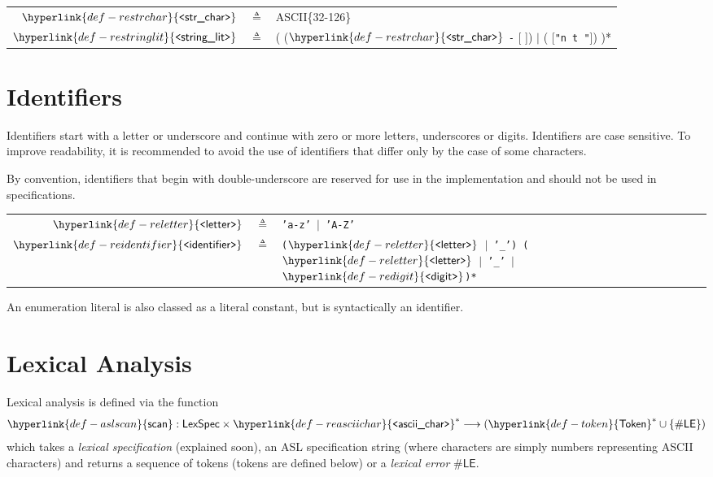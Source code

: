 \documentclass{book}
\newcommand\Char[1]{\fbox{#1}}
\newcommand\REasciichar[0]{\hyperlink{def-reasciichar}{\texttt{<}\textsf{ascii\_char}\texttt{>}}}
\newcommand\REdigit[0]{\hyperlink{def-redigit}{\texttt{<}\textsf{digit}\texttt{>}}}
\newcommand\REstrchar[0]{\hyperlink{def-restrchar}{\texttt{<}\textsf{str\_char}\texttt{>}}}
\newcommand\REstringlit[0]{\hyperlink{def-restringlit}{\texttt{<}\textsf{string\_lit}\texttt{>}}}
\newcommand\REletter[0]{\hyperlink{def-reletter}{\texttt{<}\textsf{letter}\texttt{>}}}
\newcommand\REidentifier[0]{\hyperlink{def-reidentifier}{\texttt{<}\textsf{identifier}\texttt{>}}}
\newcommand\aslscan[0]{\hyperlink{def-aslscan}{\textsf{scan}}}
\newcommand\Token[0]{\hyperlink{def-token}{\textsf{Token}}}
\newcommand\LexicalError[0]{\textsf{\#LE}}
\newcommand\LexSpec[0]{\textsf{LexSpec}}
\begin{document}
\hypertarget{def-restringlit}{}
\hypertarget{def-restrchar}{}
\begin{center}
\begin{tabular}{rcl}
$\REstrchar$ &$\triangleq$& ASCII\{32-126\}\\
$\REstringlit$ &$\triangleq$& \Char{\texttt{"}} ( ($\REstrchar$ \texttt{-} [ \Char{\texttt{"}} \Char{$\backslash$}]) $|$ (\Char{\textbackslash} [\texttt{"n t \Char{\texttt{"}} \Char{\textbackslash}"}])  )* \Char{\texttt{"}}
\end{tabular}
\end{center}

\section{Identifiers}
Identifiers start with a letter or underscore and continue with zero or more letters, underscores or digits.
Identifiers are case sensitive. To improve readability, it is recommended to avoid the use of identifiers that differ
only by the case of some characters.

By convention, identifiers that begin with double-underscore are reserved for use in the implementation and should
not be used in specifications.

\hypertarget{def-reletter}{}
\hypertarget{def-reidentifier}{}
\begin{center}
\begin{tabular}{rcl}
$\REletter$ &$\triangleq$& \texttt{'a-z' $|$ 'A-Z'}\\
$\REidentifier$ &$\triangleq$& \texttt{($\REletter$ $|$ '\_') ($\REletter$ $|$ '\_' $|$ $\REdigit$)*}\\
\end{tabular}
\end{center}

An enumeration literal is also classed as a literal constant, but is syntactically an identifier.

\section{Lexical Analysis}
Lexical analysis is defined via the function
\hypertarget{def-aslscal}{}
\[
\aslscan : \LexSpec \times \REasciichar^* \aslto (\Token^* \cup \{\LexicalError\})
\]
which takes a \emph{lexical specification} (explained soon), an ASL specification string
(where characters are simply numbers representing ASCII characters)
and returns a sequence of tokens (tokens are defined below) or a \emph{lexical error} $\LexicalError$.
\end{document}
